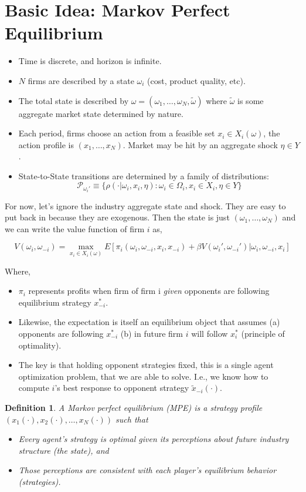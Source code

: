 \documentclass[twoside]{article}
\newtheorem{definition}[theorem]{Definition}
\begin{document}
\section{Basic Idea: Markov Perfect Equilibrium} 

\begin{itemize}
\item Time is discrete, and horizon is infinite. 
\item $N$ firms are described by a state $\omega_i$ (cost, product quality, etc). 
\item The total state is described by $\omega = (\omega_1, \ldots, \omega_N, \tilde{\omega})$
where $\tilde{\omega}$ is some aggregate market state determined by nature. 
\item Each period, firms choose an action from a feasible set $x_i \in X_i(\omega)$, the action profile is $(x_1, \ldots, x_N)$. 
Market may be hit by an aggregate shock $\eta \in Y$. 
\item State-to-State transitions are determined by a family of distributions: 
$$\mathcal{P}_{\omega_i'} \equiv \{ \rho(\cdot | \omega_i, x_i, \eta) : \omega_i \in \Omega_i, x_i \in X_i, \eta \in Y \} $$ 
\end{itemize}

For now, let's ignore the industry aggregate state and shock. They are easy to put back in because they are exogenous. Then the state 
is just $(\omega_1, \ldots, \omega_N)$ and we can write the value function of firm $i$ as, 

$$V(\omega_i, \omega_{-i}) = \max_{x_i \in X_i(\omega)}  E[  \pi_i(\omega_i, \omega_{-i}, x_i, x_{-i}) + \beta V(\omega_i', \omega_{-i}') | \omega_i, \omega_{-i}, x_i] $$

Where, 
\begin{itemize}
\item $\pi_i$ represents profits when firm of firm i \emph{given} opponents are following equilibrium strategy $x_{-i}^*$.
\item Likewise, the expectation is itself an equilibrium object that assumes (a) opponents are following $x_{-i}^*$ (b) in future firm $i$ will follow $x_i^*$ (principle of optimality). 
\item The key is that holding opponent strategies fixed, this is a single agent optimization problem, that we are able to solve. I.e., we know how to compute
$i$'s best response to opponent strategy $\tilde{x}_{-i}(\cdot)$. 
\end{itemize}
 
 \begin{definition} A Markov perfect equilibrium (MPE) is a strategy profile $(x_1(\cdot), x_2(\cdot), \ldots, x_N(\cdot))$ such that 
 \begin{itemize} 
 \item Every agent's strategy is 
 optimal given its perceptions about future industry structure (the state), and 
 \item Those perceptions are consistent with each player's equilibrium behavior (strategies). 
 \end{itemize}
 \end{definition}
 
\end{document}
